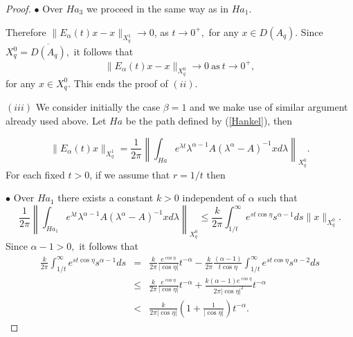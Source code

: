 \documentclass[12pt,reqno]{amsart}
\begin{document}
\begin{proof}
		
		\noindent $\bullet$  Over $Ha_3$ we proceed in the same way as in $Ha_1.$
		
		Therefore  $\|E_\alpha(t)x-x\|_{X^{1}_{q}}\rightarrow 0$,
		as $t\rightarrow 0 ^+,$ for any $x\in D(A_{q}).$ Since $X^{0}_{q}=\overline{D(A_{q})},$ it follows that $$\|E_\alpha(t)x-x\|_{X^{0}_{q}}\rightarrow 0\ \mbox{as}\ t\rightarrow 0 ^+,$$ for any $x\in X^{0}_{q}$. This ends the proof of $(ii)$.
		
		
		
		\noindent $(iii)$ 
		We consider initially the case $\beta =1 $ and we make use of similar argument already used above. Let $Ha$ be the path defined by (\ref{Hankel}), then
		
		\[\|E_{\alpha}(t)x\|_{X^{1}_{q}}=\frac{1}{2\pi}\left\|\int_{Ha}e^{\lambda t}\lambda^{\alpha-1} A(\lambda^{\alpha}-A)^{-1}xd\lambda\right\|_{X^{0}_{q}}.\]
		For each fixed $t>0$, if we assume that $r=1/t$ then
		
		
		\noindent $\bullet$  Over $Ha_1$ there exists a constant $k>0$ independent of $\alpha$ such that
		\begin{equation*}
			\frac{1}{2\pi}\left\|\int_{Ha_1}e^{\lambda t}\lambda^{\alpha-1} A(\lambda^{\alpha}-A)^{-1}xd\lambda\right\|_{X^{0}_{q}} \leq \frac{k}{2\pi}\int_{1/t}^\infty e^{st\cos\eta} s^{\alpha-1}ds\|x\|_{X^{0}_{q}}.
		\end{equation*}
		Since $\alpha-1 > 0,$ it follows that
		\begin{eqnarray*}
			\frac{k}{2\pi}\int_{1/t}^\infty e^{st\cos\eta} s^{\alpha-1}ds & = & \frac{k}{2\pi}\frac{e^{\cos\eta}}{|\cos\eta|}t^{-\alpha} -\frac{k}{2\pi}\frac{(\alpha-1)}{t\cos\eta}\int_{1/t}^\infty e^{st\cos\eta}s^{\alpha-2}ds\\
			&\leq & \frac{k}{2\pi}\frac{e^{\cos\eta}}{|\cos\eta|}t^{-\alpha} +\frac{k(\alpha-1)e^{\cos\eta}}{2\pi|\cos\eta|^2}t^{-\alpha}\\
			& < & \frac{k}{2\pi|\cos\eta|}\left(1+\frac{1}{|\cos\eta |}\right)t^{-\alpha}.
		\end{eqnarray*}
		

\end{proof}
\end{document}
